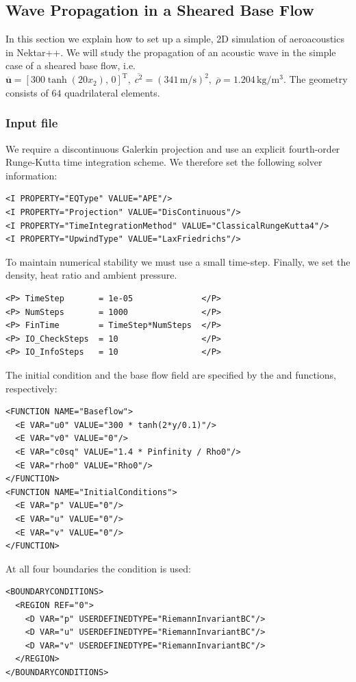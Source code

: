 \subsection{Wave Propagation in a Sheared Base Flow}
In this section we explain how to set up a simple, 2D simulation of aeroacoustics in
Nektar++. We will study the propagation of an acoustic wave in the simple case of a sheared base flow, i.e. $\overline{\boldsymbol{u}} = \left[300  \tanh(20 x_2),\, 0\right]^\mathrm{T}, \; \overline{c^2}=\left(341\, \mathrm{m}/\mathrm{s}\right)^2, \; \overline{\rho} = 1.204\, \mathrm{kg}/\mathrm{m}^3$. The geometry consists
of $64$ quadrilateral elements.

\subsubsection{Input file}
We require a discontinuous Galerkin projection and use an explicit
fourth-order Runge-Kutta time integration scheme. We therefore set the following
solver information:
\begin{lstlisting}[style=XmlStyle]
<I PROPERTY="EQType" VALUE="APE"/>
<I PROPERTY="Projection" VALUE="DisContinuous"/>
<I PROPERTY="TimeIntegrationMethod" VALUE="ClassicalRungeKutta4"/>
<I PROPERTY="UpwindType" VALUE="LaxFriedrichs"/>
\end{lstlisting}

To maintain numerical stability we must use a small time-step.
Finally, we set the density, heat ratio and ambient pressure.
\begin{lstlisting}[style=XMLStyle]
<P> TimeStep       = 1e-05              </P>
<P> NumSteps       = 1000               </P>
<P> FinTime        = TimeStep*NumSteps  </P>
<P> IO_CheckSteps  = 10                 </P>
<P> IO_InfoSteps   = 10                 </P>
\end{lstlisting}

The initial condition and the base flow field are specified by the   and   functions, respectively:
\begin{lstlisting}[style=XMLStyle]
<FUNCTION NAME="Baseflow">
  <E VAR="u0" VALUE="300 * tanh(2*y/0.1)"/>
  <E VAR="v0" VALUE="0"/>
  <E VAR="c0sq" VALUE="1.4 * Pinfinity / Rho0"/>
  <E VAR="rho0" VALUE="Rho0"/>
</FUNCTION>
<FUNCTION NAME="InitialConditions">
  <E VAR="p" VALUE="0"/>
  <E VAR="u" VALUE="0"/>
  <E VAR="v" VALUE="0"/>
</FUNCTION>
\end{lstlisting}

At all four boundaries the  condition is used:
\begin{lstlisting}[style=XMLStyle]
<BOUNDARYCONDITIONS>
  <REGION REF="0">
    <D VAR="p" USERDEFINEDTYPE="RiemannInvariantBC"/>
    <D VAR="u" USERDEFINEDTYPE="RiemannInvariantBC"/>
    <D VAR="v" USERDEFINEDTYPE="RiemannInvariantBC"/>
  </REGION>
</BOUNDARYCONDITIONS>
\end{lstlisting}

